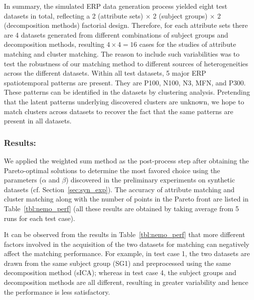 In summary, the simulated ERP data generation process yielded eight test datasets in total, reflecting a 2 (attribute sets) $\times$ 2 (subject groups) $\times$ 2 (decomposition methods) factorial design. Therefore, for each attribute sets there are 4 datasets generated from different combinations of subject groups and decomposition methods, resulting $4 \times 4 = 16$ cases for the studies of attribute matching and cluster matching. The reason to include such variabilities was to test the robustness of our matching method to different sources of heterogeneities across the different datasets. Within all test datasets, 5 major ERP spatiotemporal patterns are present. They are P100, N100, N3, MFN, and P300. These patterns can be identified in the datasets by clustering analysis. Pretending that the latent patterns underlying discovered clusters are unknown, we hope to match clusters across datasets to recover the fact that the same patterns are present in all datasets.

\subsubsection{Results:}
We applied the weighted sum method as the post-process step after obtaining the Pareto-optimal solutions to determine the most favored choice using the parameters ($\alpha$ and $\beta$) discovered in the preliminary experiments on synthetic datasets (cf. Section~\ref{sec:syn_exp}). The accuracy of attribute matching and cluster matching along with the number of points in the Pareto front are listed in Table~\ref{tbl:nemo_perf} (all these results are obtained by taking average from 5 runs for each test case).


It can be observed from the results in Table~\ref{tbl:nemo_perf} that more different factors involved in the acquisition of the two datasets for matching can negatively affect the matching performance. For example, in test case 1, the two datasets are drawn from the same subject group (SG1) and preprocessed using the same decomposition method (sICA); whereas in test case 4, the subject groups and decomposition methods are all different, resulting in greater variability and hence the performance is less satisfactory.

